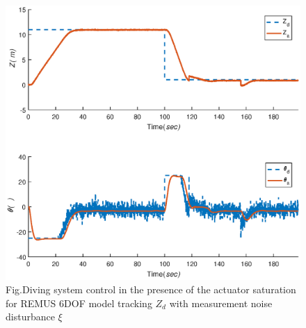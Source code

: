 \begin{figure}[!htp]%
\centering
\includegraphics[width=0.85\linewidth]{figure/chap6/Fig6_cmdpulse_1.eps}
\label{fig:chap6:F13}
 {Fig.}{Diving system control in the presence of the actuator saturation for REMUS 6DOF model tracking $Z_{d}$ with measurement noise disturbance $\xi$}
\end{figure}

